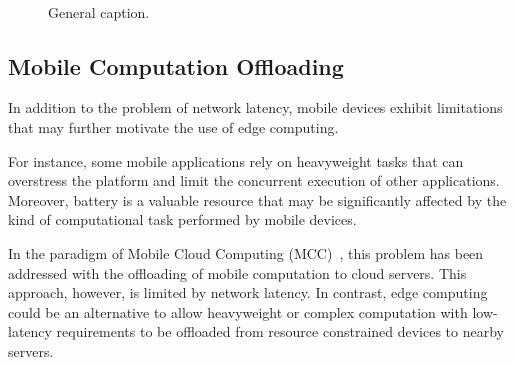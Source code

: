 
\begin{figure}[tbp]
	\centering
	\hfill
	~
	\hfill
	\caption{General caption.} \label{fig:1}
\end{figure}

\subsection{Mobile Computation Offloading}

In addition to the problem of network latency, mobile devices exhibit limitations that may further motivate the use of edge computing. 

For instance, some mobile applications rely on heavyweight tasks that can overstress the platform and limit the concurrent execution of other applications. Moreover, battery is a valuable resource that may be significantly affected by the kind of computational task performed by mobile devices. 

In the paradigm of Mobile Cloud Computing (MCC)~\cite{Khan:14}, this problem has been addressed with the offloading of mobile computation to cloud servers. This approach, however, is limited by network latency. In contrast, edge computing could be an alternative to allow heavyweight or complex computation with low-latency requirements to be offloaded from resource constrained devices to nearby servers.


